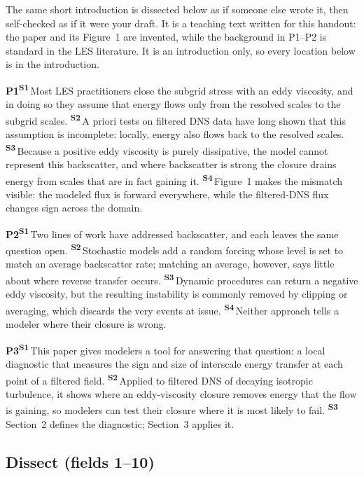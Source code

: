 \documentclass[11pt]{article}
\newcommand{\sn}[1]{\textsuperscript{\sffamily\bfseries\color{accent}S#1}\,}  %
\newcommand{\pn}[1]{{\sffamily\bfseries\color{accent}P#1}\enspace}           %
\begin{document}
The same short introduction is dissected below as if someone else wrote it, then self-checked as if it were your
draft. It is a teaching text written for this handout: the paper and its Figure~1 are invented, while the
background in P1--P2 is standard in the LES literature. It is an introduction only, so every location below is
in the introduction.

\begin{panel}[breakable=false]
\pn{1}\sn{1}Most LES practitioners close the subgrid stress with an eddy viscosity, and in doing so they assume
that energy flows only from the resolved scales to the subgrid scales.
\sn{2}A priori tests on filtered DNS data have long shown that this assumption is incomplete: locally, energy
also flows back to the resolved scales.
\sn{3}Because a positive eddy viscosity is purely dissipative, the model cannot represent this backscatter, and
where backscatter is strong the closure drains energy from scales that are in fact gaining it.
\sn{4}Figure~1 makes the mismatch visible: the modeled flux is forward everywhere, while the filtered-DNS flux
changes sign across the domain.\par\medskip
\pn{2}\sn{1}Two lines of work have addressed backscatter, and each leaves the same question open.
\sn{2}Stochastic models add a random forcing whose level is set to match an average backscatter rate; matching
an average, however, says little about where reverse transfer occurs.
\sn{3}Dynamic procedures can return a negative eddy viscosity, but the resulting instability is commonly removed
by clipping or averaging, which discards the very events at issue.
\sn{4}Neither approach tells a modeler where their closure is wrong.\par\medskip
\pn{3}\sn{1}This paper gives modelers a tool for answering that question: a local diagnostic that measures the
sign and size of interscale energy transfer at each point of a filtered field.
\sn{2}Applied to filtered DNS of decaying isotropic turbulence, it shows where an eddy-viscosity closure removes
energy that the flow is gaining, so modelers can test their closure where it is most likely to fail.
\sn{3}Section~2 defines the diagnostic; Section~3 applies it.
\end{panel}

\subsection{Dissect (fields 1--10)}
\end{document}
